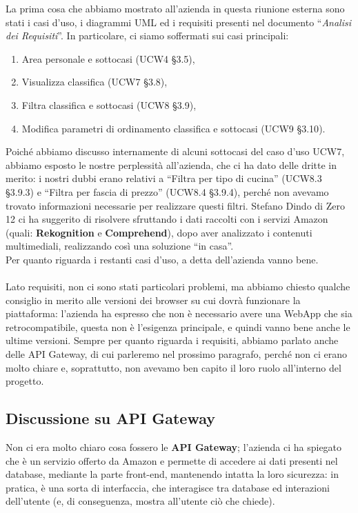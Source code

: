 La prima cosa che abbiamo mostrato all'azienda in questa riunione esterna sono stati i casi d'uso, i diagrammi UML ed i requisiti presenti nel documento “\textit{Analisi dei Requisiti}”. In particolare, ci siamo soffermati sui casi principali:

\begin{enumerate}
\item Area personale e sottocasi (UCW4 \S{}3.5),
\item Visualizza classifica (UCW7 \S{}3.8),
\item Filtra classifica e sottocasi (UCW8 \S{}3.9),
\item Modifica parametri di ordinamento classifica e sottocasi (UCW9 \S{3.10}).
\end{enumerate}

Poiché abbiamo discusso internamente di alcuni sottocasi del caso d'uso UCW7, abbiamo esposto le nostre perplessità all'azienda, che ci ha dato delle dritte in merito: i nostri dubbi erano relativi a “Filtra per tipo di cucina” (UCW8.3 \S{}3.9.3) e “Filtra per fascia di prezzo” (UCW8.4 \S{}3.9.4), perché non avevamo trovato informazioni necessarie per realizzare questi filtri. Stefano Dindo di Zero 12 ci ha suggerito di risolvere sfruttando i dati raccolti con i servizi Amazon (quali: \textbf{Rekognition} e \textbf{Comprehend}), dopo aver analizzato i contenuti multimediali, realizzando così una soluzione “in casa”.
\\
Per quanto riguarda i restanti casi d'uso, a detta dell'azienda vanno bene.
\\ \\
Lato requisiti, non ci sono stati particolari problemi, ma abbiamo chiesto qualche consiglio in merito alle versioni dei browser su cui dovrà funzionare la piattaforma: l'azienda ha espresso che non è necessario avere una WebApp che sia retrocompatibile, questa non è l'esigenza principale, e quindi vanno bene anche le ultime versioni. Sempre per quanto riguarda i requisiti, abbiamo parlato anche delle API Gateway, di cui parleremo nel prossimo paragrafo, perché non ci erano molto chiare e, soprattutto, non avevamo ben capito il loro ruolo all'interno del progetto.

\subsection{Discussione su API Gateway}

Non ci era molto chiaro cosa fossero le \textbf{API Gateway}; l'azienda ci ha spiegato che è un servizio offerto da Amazon e permette di accedere ai dati presenti nel database, mediante la parte front-end, mantenendo intatta la loro sicurezza: in pratica, è una sorta di interfaccia, che interagisce tra database ed interazioni dell'utente (e, di conseguenza, mostra all'utente ciò che chiede).


